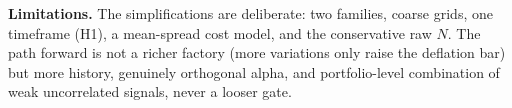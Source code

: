 \documentclass[11pt]{article}
\begin{document}
\textbf{Limitations.} The simplifications are deliberate: two families, coarse grids, one
timeframe (H1), a mean-spread cost model, and the conservative raw $N$. The path forward is not
a richer factory (more variations only raise the deflation bar) but more history, genuinely
orthogonal alpha, and portfolio-level combination of weak uncorrelated signals, never a looser gate.
\end{document}

